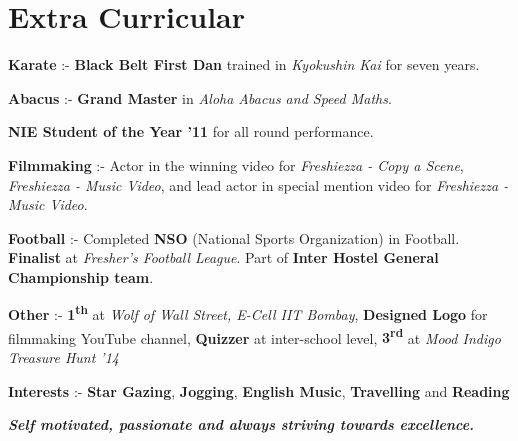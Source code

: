 \documentclass[11pt]{resume}
\begin{document}
\begin{resume}
\begin{list2}
\end{list2}





\section{\mysidestyle Extra Curricular}
\begin{list2}
\item \textbf {Karate} :- \textbf{Black Belt First Dan} trained in \textsl{Kyokushin Kai} for seven years. 
\item \textbf {Abacus} :- \textbf{Grand Master} in \textsl{Aloha Abacus and Speed Maths}. 
\item \textbf {NIE Student of the Year '11} for all round performance. 
\item \textbf {Filmmaking} :- Actor in the winning video for \textsl{Freshiezza - Copy a Scene}, \textsl{Freshiezza - Music Video}, and lead actor in special mention video for \textsl{Freshiezza - Music Video}.

\item \textbf {Football} :- Completed \textbf{NSO} (National Sports Organization) in Football. \textbf{Finalist} at \textsl{Fresher's Football League}. Part of \textbf{Inter Hostel General Championship team}.
\item \textbf {Other} :- \textbf{1\textsuperscript{th}} at \textsl {Wolf of Wall Street, E-Cell IIT Bombay}, \textbf{Designed Logo} for filmmaking YouTube channel, \textbf{Quizzer} at inter-school level, \textbf{3\textsuperscript{rd}} at \textsl{Mood Indigo Treasure Hunt '14}
\item \textbf {Interests} :- \textbf{Star Gazing}, \textbf{Jogging}, \textbf{English Music}, \textbf{Travelling} and \textbf{Reading}
\end{list2}
\textit{\textbf{Self motivated, passionate and always striving towards excellence.}}


    

\end{resume}
\end{document}
